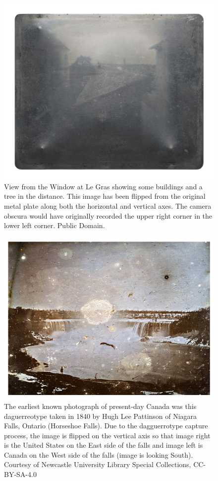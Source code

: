 \documentclass[
]{book}
\begin{document}
\begin{figure}
\includegraphics[width=0.75\linewidth]{images/01-View-from-the-Window-at-Le-Gras} \caption{View from the Window at Le Gras showing some buildings and a tree in the distance. This image has been flipped from the original metal plate along both the horizontal and vertical axes. The camera obscura would have originally recorded the upper right corner in the lower left corner. Public Domain.}\label{fig:1-View-from-the-Window-at-Le-Gras}
\end{figure}

\begin{figure}
\includegraphics[width=0.75\linewidth]{images/01-niagara-falls-daguerreotype-1840} \caption{The earliest known photograph of present-day Canada was this daguerreotype taken in 1840 by Hugh Lee Pattinson of Niagara Falls, Ontario (Horseshoe Falls). Due to the dagguerrotype capture process, the image is flipped on the vertical axis so that image right is the United States on the East side of the falls and image left is Canada on the West side of the falls (image is looking South). Courtesy of Newcastle University Library Special Collections, CC-BY-SA-4.0}\label{fig:1-niagara-falls-daguerreotype-1840}
\end{figure}
\end{document}
